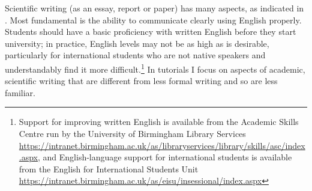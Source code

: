 Scientific writing (as an essay, report or paper) has many aspects, as indicated in . Most fundamental is the ability to communicate clearly using English properly. Students should have a basic proficiency with written English before they start university; in practice, English levels may not be as high as is desirable, particularly for international students who are not native speakers and understandably find it more difficult.\footnote{Support for improving written English is available from the Academic Skills Centre run by the University of Birmingham Library Services \url{https://intranet.birmingham.ac.uk/as/libraryservices/library/skills/asc/index.aspx}, and English-language support for international students is available from the English for International Students Unit \url{https://intranet.birmingham.ac.uk/as/eisu/insessional/index.aspx}} In tutorials I focus on aspects of academic, scientific writing that are different from less formal writing and so are less familiar.

